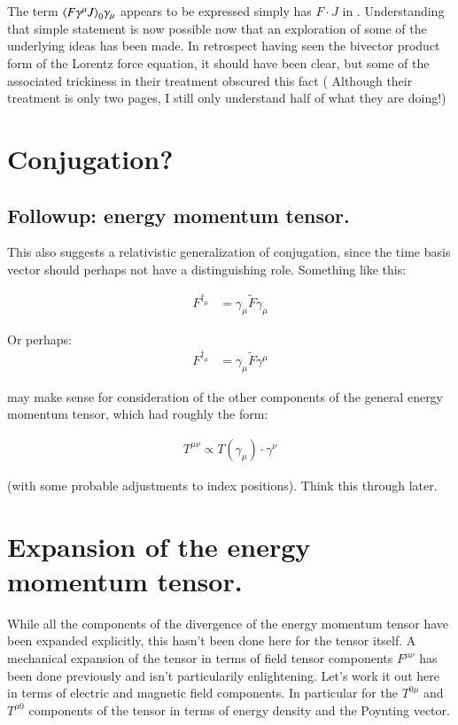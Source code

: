 \documentclass{article}
\begin{document}
The term ${\left\langle{{ F \gamma^\mu J }}\right\rangle}_{0} \gamma_\mu $ appears to be expressed simply has $F \cdot J$ in
\cite{doran2003gap}.  Understanding that simple statement is now possible now that an exploration
of some of the underlying ideas has been made.  In retrospect having seen the bivector product form of the Lorentz force equation, it should have been 
clear, but some of the associated trickiness in their treatment obscured this
fact ( Although their treatment is only two pages, I still only 
understand half of what they are doing!)

\section{ Conjugation? }
\subsection{ Followup: energy momentum tensor. }

This also suggests a relativistic generalization of conjugation, since the time basis vector should perhaps not have
a distinguishing role.  Something like this:

\begin{align*}
F^{\dagger_\mu} &= \gamma_\mu \tilde{F} \gamma_\mu
\end{align*}

Or perhaps:
\begin{align*}
F^{\dagger_\mu} &= \gamma_\mu \tilde{F} \gamma^\mu
\end{align*}

may make sense for consideration of the other components of the general energy momentum tensor, which had roughly the form:

\begin{align*}
T^{\mu\nu} \propto T(\gamma_\mu) \cdot \gamma^\nu
\end{align*}

(with some probable adjustments to index positions).  Think this through later.

\section{ Expansion of the energy momentum tensor. }

While all the components of the divergence of the energy momentum tensor have been expanded explicitly, this hasn't been
done here for the tensor itself.  A mechanical expansion of the tensor in terms of field tensor components $F^{\mu\nu}$ has been 
done previously and isn't particularily enlightening.  Let's work it out here in terms of electric and magnetic field components.  In particular for the $T^{0\mu}$ and $T^{\mu0}$ components of the tensor in terms of energy density and the Poynting vector.
\end{document}
